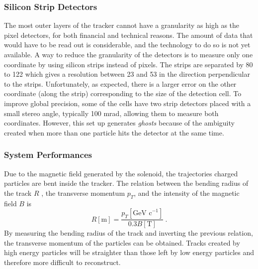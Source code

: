 			\subsubsection{Silicon Strip Detectors}
			\label{sec:lhc_and_cms__silicon_strip_detectors}

				The most outer layers of the tracker cannot have a granularity as high as the pixel detectors, for both financial and technical reasons. The amount of data that would have to be read out is considerable, and the technology to do so is not yet available. A way to reduce the granularity of the detectors is to measure only one coordinate by using silicon strips instead of pixels. The strips are separated by 80 to 122 \um{} which gives a resolution between 23 \um{} and 53 \um{} in the direction perpendicular to the strips. Unfortunately, as expected, there is a larger error on the other coordinate (along the strip) corresponding to the size of the detection cell. To improve global precision, some of the cells have two strip detectors placed with a small stereo angle, typically 100 mrad, allowing them to measure both coordinates. However, this set up generates \emph{ghosts} because of the ambiguity created when more than one particle hits the detector at the same time.

			\subsubsection{System Performances}
			\label{sec:lhc_and_cms__tracker_system_performances}

				Due to the magnetic field generated by the solenoid, the trajectories charged particles are bent inside the tracker. The relation between the bending radius of the track $ R $ , the transverse momentum $ p_T $, and the intensity of the magnetic field $ B $ is
				\begin{equation}
					R[\mbox{m}] = \frac{p_T[\mbox{GeV c}^{-1}]}{0.3 B[\mbox{T}]} \ .
					\label{eq:lhc_and_cms__radius_to_momentum_relation}
				\end{equation}
				By measuring the bending radius of the track and inverting the previous relation, the transverse momentum of the particles can be obtained. Tracks created by high energy particles will be straighter than those left by low energy particles and therefore more difficult to reconstruct. \\

